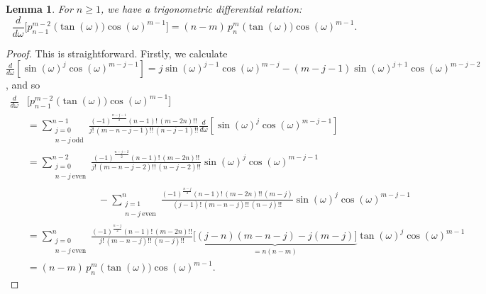\documentclass{amsart}
\newcommand{\p}[2]{p_{#1}^{#2}\;\!\!}
\theoremstyle{plain}
\newtheorem{lemma}[theorem]{Lemma}
\theoremstyle{definition}
\theoremstyle{remark}
\begin{document}
\begin{lemma} \label{trigonometric}
For $n\geq 1$, we have a trigonometric differential relation:
\begin{equation*}
\frac{d}{d\omega} \Big[\p{n-1}{m-2}\big(\tan(\omega)\big)\cos(\omega)^{m-1} \Big]= (n-m)\, \p{n}{m}\big(\tan(\omega)\big)\cos(\omega)^{m-1}.
\end{equation*} 
\end{lemma}
\begin{proof} This is straightforward.
Firstly, we calculate $ \frac{d}{d\omega}\! \left[\sin(\omega)^j \cos(\omega)^{m-j-1}\right] = j \sin(\omega)^{j-1} \cos(\omega)^{m-j}-(m\!-\!j\!-\!1)\sin(\omega)^{j+1} \cos(\omega)^{m-j-2}$, and so
\begin{align*}%
\frac{d}{d\omega} &\Big[\p{n-1}{m-2}\big(\tan(\omega)\big)\cos(\omega)^{m-1} \Big] 
\\&=\!\! \textstyle \sum\limits_{\substack{j=0\\ n-j\ \text{odd}}}^{n-1} \!\!\!\frac{(-1)^{\frac{n-j-1}{2}}  (n-1)!\,(m-2n)!!}{j!\,(m-n-j-1)!!\,(n-j-1)!!}\frac{d}{d\omega}\! \left[\sin(\omega)^j \cos(\omega)^{m-j-1}\right]
\\ &=\!\!\textstyle\sum\limits_{\substack{j=0\\ n-j\ \text{even}}}^{n-2} \!\!\!\frac{(-1)^{\frac{n-j-2}{2}}(n-1)!\,(m-2n)!!}{j!\,(m-n-j-2)!!\,(n-j-2)!!}\sin(\omega)^{j} \cos(\omega)^{m-j-1} \\[-3mm]
&\hspace{3cm}-\textstyle\sum\limits_{\substack{j=1\\ n-j\ \text{even}}}^{n}\!\!\! \frac{(-1)^{\frac{n-j}{2}}(n-1)!\,(m-2n)!!\,(m-j)}{(j-1)!\,(m-n-j)!!\,(n-j)!!}\sin(\omega)^{j} \cos(\omega)^{m-j-1} \\
&=\!\!\textstyle\sum\limits_{\substack{j=0\\ n-j\ \text{even}}}^{n} \!\!\!\frac{(-1)^{\frac{n-j}{2}}(n-1)!\,(m-2n)!!}{j!\,(m-n-j)!!\,(n-j)!!}\underbrace{\big[(j\!-\!n)(m\!-\!n\!-\!j)-j(m\!-\!j)\big] }_{=n(n-m)}\tan(\omega)^{j} \cos(\omega)^{m-1}
\\ &= \textstyle(n-m)\, \p{n}{m}\big(\tan(\omega)\big)\cos(\omega)^{m-1}.
\end{align*} \nobreak
\end{proof}
\end{document}
